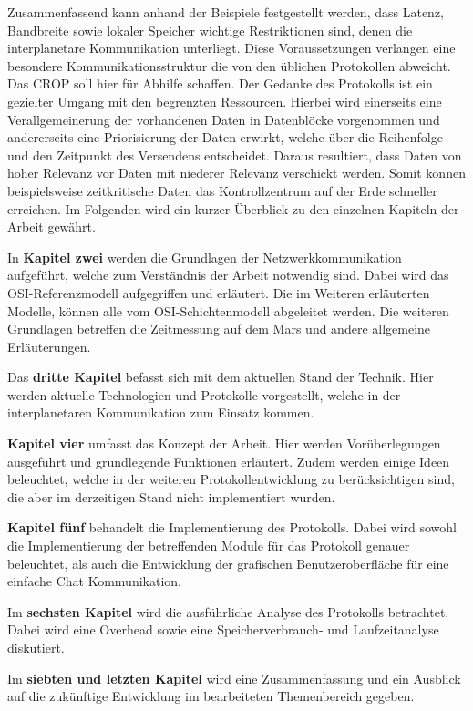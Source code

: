 Zusammenfassend kann anhand der Beispiele festgestellt werden, dass Latenz, 
Bandbreite sowie lokaler Speicher wichtige Restriktionen sind, denen die 
interplanetare Kommunikation unterliegt. Diese Voraussetzungen verlangen 
eine besondere Kommunikationsstruktur die von den {\"u}blichen Protokollen 
abweicht. Das \gls{CROP} soll hier f{\"u}r Abhilfe schaffen.
Der Gedanke des Protokolls ist ein gezielter Umgang mit den begrenzten 
Ressourcen. Hierbei wird einerseits eine Verallgemeinerung der vorhandenen 
Daten in Datenbl{\"o}cke vorgenommen und andererseits eine Priorisierung der 
Daten erwirkt, welche {\"u}ber die Reihenfolge und den Zeitpunkt des 
Versendens entscheidet. Daraus resultiert, dass Daten von hoher Relevanz 
vor Daten mit niederer Relevanz verschickt werden. Somit k{\"o}nnen 
beispielsweise zeitkritische Daten das Kontrollzentrum auf der Erde 
schneller erreichen. Im Folgenden wird ein kurzer {\"U}berblick zu den einzelnen
Kapiteln der Arbeit gew{\"a}hrt.

In \textbf{Kapitel zwei} werden die Grundlagen der Netzwerkkommunikation
aufgef{\"u}hrt, welche zum Verst{\"a}ndnis der Arbeit notwendig sind. Dabei wird
\zB das OSI-Referenzmodell aufgegriffen und erl{\"a}utert. Die im Weiteren
erl{\"a}uterten Modelle, k{\"o}nnen alle vom OSI-Schichtenmodell abgeleitet
werden. Die weiteren Grundlagen betreffen die Zeitmessung auf dem Mars und
andere allgemeine Erl{\"a}uterungen.

Das \textbf{dritte Kapitel} befasst sich mit dem aktuellen Stand der Technik.
Hier werden aktuelle Technologien und Protokolle vorgestellt, welche in der interplanetaren
Kommunikation zum Einsatz kommen.

\textbf{Kapitel vier} umfasst das Konzept der Arbeit. Hier werden
Vor{\"u}berlegungen ausgef{\"u}hrt und grundlegende Funktionen erl{\"a}utert.
Zudem werden einige Ideen beleuchtet, welche in der weiteren
Protokollentwicklung zu ber{\"u}cksichtigen sind, die aber im derzeitigen Stand
nicht implementiert wurden.

\textbf{Kapitel f{\"u}nf} behandelt die Implementierung des Protokolls. Dabei
wird sowohl die Implementierung der betreffenden Module für das Protokoll
genauer beleuchtet, als auch die Entwicklung der grafischen Benutzeroberfläche
f{\"u}r eine einfache Chat Kommunikation.

Im \textbf{sechsten Kapitel} wird die ausf{\"u}hrliche Analyse des Protokolls
betrachtet.
Dabei wird eine Overhead sowie eine Speicherverbrauch- und
Laufzeitanalyse diskutiert.

Im \textbf{siebten und letzten Kapitel} wird eine Zusammenfassung und ein
Ausblick auf die zuk{\"u}nftige Entwicklung im bearbeiteten Themenbereich gegeben.

